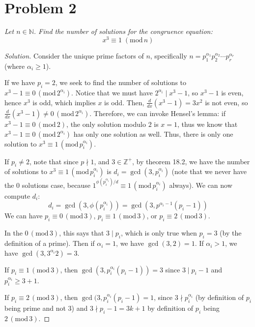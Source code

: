 \documentclass{article}
\newcommand{\N}{{\mathbb N}}
\newcommand{\Z}{{\mathbb Z}}
\begin{document}
\section{Problem 2}
{\it Let $n \in \N$.
Find the number of solutions for the congruence equation:
\[
	x^3 \equiv 1 \; (\mathrm{mod}\, n)
\]
}
\begin{proof}[Solution]\let\qed\relax
	Consider the unique prime factors of $n$,
	specifically $n = p_1^{\alpha_1}p_2^{\alpha_2} \cdots p_r^{\alpha_r}$
	(where $\alpha_i \geq 1$).

	If we have $p_i = 2$, we seek to find the number of solutions to
	$x^3 - 1 \equiv 0 \, (\mathrm{mod}\, 2^{\alpha_i})$.
	Notice that we must have $2^{\alpha_i} \mid x^3 - 1$,
	so $x^3 - 1$ is even, hence $x^3$ is odd, which implies $x$ is odd.
	Then, $\frac{d}{dx}(x^3-1) = 3x^2$ is not even,
	so $\frac{d}{dx}(x^3-1) \neq 0 \,(\mathrm{mod}\,2^{\alpha_i})$.
	Therefore, we can invoke Hensel's lemma:
	if $x^3 - 1 \equiv 0 \, (\mathrm{mod}\, 2)$,
	the only solution modulo $2$ is $x = 1$,
	thus we know that $x^3 - 1 \equiv 0 \,(\mathrm{mod}\, 2^{\alpha_i})$
	has only one solution as well.
	Thus, there is only one solution to $x^3 \equiv 1 \, (\mathrm{mod}\, p_i^{\alpha_i})$.

	If $p_i \neq 2$,
	note that since $p \nmid 1$, and $3 \in \Z^+$,
	by theorem 18.2, we have the number of solutions to
	$x^3 \equiv 1 \,(\mathrm{mod}\,p_i^{\alpha_i})$
	is $d_i = \gcd(3,p_i^{\alpha_i})$
	(note that we never have the $0$ solutions case,
	because $1^{\phi(p_i^{\alpha_i})/d} \equiv 1 \, (\mathrm{mod}\,p_i^{\alpha_i})$ always).
	We can now compute $d_i$:
	\[
		d_i = \gcd(3,\phi(p_i^{\alpha_i})) = \gcd(3, p^{\alpha_i-1}(p_i-1))
	\]
	We can have $p_i \equiv 0\, (\mathrm{mod}\, 3)$,
	$p_i \equiv 1\, (\mathrm{mod}\, 3)$,
	or $p_i \equiv 2\, (\mathrm{mod}\, 3)$.

	In the $0\, (\mathrm{mod}\, 3)$, this says that $3 \mid p_i$,
	which is only true when $p_i = 3$ (by the definition of a prime).
	Then if $\alpha_i = 1$, we have $\gcd(3,2) = 1$.
	If $\alpha_i > 1$, we have $\gcd(3,3^{\alpha_i}2) = 3$.

	If $p_i \equiv 1\, (\mathrm{mod}\, 3)$, then
	$\gcd(3,p_i^{\alpha_i}(p_i - 1)) = 3$ since $3 \mid p_i - 1$
	and $p_i^{\alpha_i} \geq 3+1$.
	
	If $p_i \equiv 2\, (\mathrm{mod}\, 3)$,
	then $\gcd(3,p_i^{\alpha_i}(p_i-1) = 1$,
	since $3 \nmid p_i^{\alpha_i}$ (by definition of $p_i$ being prime and not $3$)
	and $3 \nmid p_i - 1 = 3k + 1$
	by definition of $p_i$ being $2\, (\mathrm{mod}\, 3)$.


\end{proof}
\end{document}
